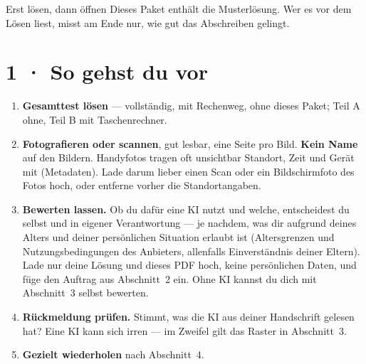 \documentclass[11pt]{article}
\begin{document}

\begin{lpachtung}{Erst lösen, dann öffnen}
Dieses Paket enthält die Musterlösung. Wer es vor dem Lösen liest, misst am Ende nur, wie gut das Abschreiben gelingt.
\end{lpachtung}

\section*{1 · So gehst du vor}
\begin{enumerate}[leftmargin=*,itemsep=2pt]
\item \textbf{Gesamttest lösen} — vollständig, mit Rechenweg, ohne dieses Paket; Teil A ohne, Teil B mit Taschenrechner.
\item \textbf{Fotografieren oder scannen}, gut lesbar, eine Seite pro Bild. \textbf{Kein Name} auf den Bildern.
  Handyfotos tragen oft unsichtbar Standort, Zeit und Gerät mit (Metadaten). Lade darum lieber einen Scan oder ein
  Bildschirmfoto des Fotos hoch, oder entferne vorher die Standortangaben.
\item \textbf{Bewerten lassen.} Ob du dafür eine KI nutzt und welche, entscheidest du selbst und in eigener Verantwortung —
  je nachdem, was dir aufgrund deines Alters und deiner persönlichen Situation erlaubt ist (Altersgrenzen und
  Nutzungsbedingungen des Anbieters, allenfalls Einverständnis deiner Eltern). Lade nur deine Lösung und dieses PDF hoch,
  keine persönlichen Daten, und füge den Auftrag aus Abschnitt~2 ein. Ohne KI kannst du dich mit Abschnitt~3 selbst bewerten.
\item \textbf{Rückmeldung prüfen.} Stimmt, was die KI aus deiner Handschrift gelesen hat? Eine KI kann sich irren —
  im Zweifel gilt das Raster in Abschnitt~3.
\item \textbf{Gezielt wiederholen} nach Abschnitt~4.
\end{enumerate}

\end{document}
